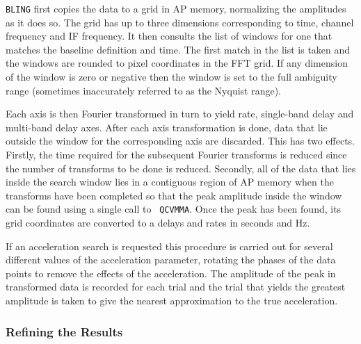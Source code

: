 {\tt BLING} first copies the data to a grid in AP memory, normalizing
the amplitudes as it does so.  The grid has up to three dimensions
corresponding to time, channel frequency and IF frequency.  It then
consults the list of windows for one that matches the baseline
definition and time.  The first match in the list is taken and the
windows are rounded to pixel coordinates in the FFT grid.  If any
dimension of the window is zero or negative then the window is set to
the full ambiguity range (sometimes inaccurately referred to as the
Nyquist range).

Each axis is then Fourier transformed in turn to yield rate,
single-band delay and multi-band delay axes.  After each axis
transformation is done, data that lie outside the window for the
corresponding axis are discarded.  This has two effects.  Firstly, the
time required for the subsequent Fourier transforms is reduced since
the number of transforms to be done is reduced.  Secondly, all of the
data that lies inside the search window lies in a contiguous region of
AP memory when the transforms have been completed so that the peak
amplitude inside the window can be found using a single call to {\tt
QCVMMA}.  Once the peak has been found, its grid coordinates are
converted to a delays and rates in seconds and Hz.

If an acceleration search is requested this procedure is carried out
for several different values of the acceleration parameter, rotating
the phases of the data points to remove the effects of the
acceleration.  The amplitude of the peak in transformed data is
recorded for each trial and the trial that yields the greatest
amplitude is taken to give the nearest approximation to the true
acceleration.

\subsubsection{Refining the Results}

